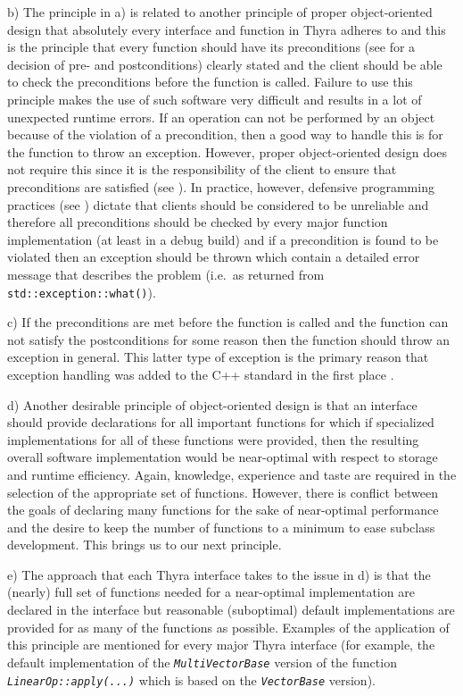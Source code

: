\documentclass[pdf,ps2pdf,11pt]{SANDreport}
\begin{document}
b) The principle in a) is related to another principle of proper
object-oriented design that absolutely every interface and function in
Thyra adheres to and this is the principle that every function should
have its preconditions (see {}\cite{ref:uml_distilled_2nd_ed} for a
decision of pre- and postconditions) clearly stated and the client
should be able to check the preconditions before the function is called.
Failure to use this principle makes the use of such software very
difficult and results in a lot of unexpected runtime errors.  If an
operation can not be performed by an object because of the violation
of a precondition, then a good way to handle this is for the function to
throw an exception.  However, proper object-oriented design does not
require this since it is the responsibility of the client to ensure
that preconditions are satisfied (see
{}\cite{ref:uml_distilled_2nd_ed}).  In practice, however, defensive
programming practices (see {}\cite{ref:stroustrup_1997}) dictate that
clients should be considered to be unreliable and therefore all
preconditions should be checked by every major function implementation
(at least in a debug build) and if a precondition is found to be
violated then an exception should be thrown which contain a detailed
error message that describes the problem (i.e.~as returned from
{}\texttt{std::exception::what()}).

c) If the preconditions are met before the function is called and the
function can not satisfy the postconditions for some reason then the
function should throw an exception in general.  This latter type of
exception is the primary reason that exception handling was added to
the C++ standard in the first place {}\cite{ref:design_evol_cpp}.

d) Another desirable principle of object-oriented design is that an
interface should provide declarations for all important functions for
which if specialized implementations for all of these functions were
provided, then the resulting overall software implementation would be
near-optimal with respect to storage and runtime efficiency.  Again,
knowledge, experience and taste are required in the selection of the
appropriate set of functions.  However, there is conflict between the
goals of declaring many functions for the sake of near-optimal
performance and the desire to keep the number of functions to a minimum
to ease subclass development.  This brings us to our next principle.

e) The approach that each Thyra interface takes to the issue in d)
is that the (nearly) full set of functions needed for a near-optimal
implementation are declared in the interface but reasonable
(suboptimal) default implementations are provided for as many of the
functions as possible.  Examples of the application of this principle
are mentioned for every major Thyra interface (for example, the
default implementation of the {}\texttt{\textit{Multi\-Vector\-Base}}
version of the function {}\texttt{\textit{LinearOp\-::apply(\-...)}} 
which is based on the {}\texttt{\textit{Vector\-Base}} version).
\end{document}
